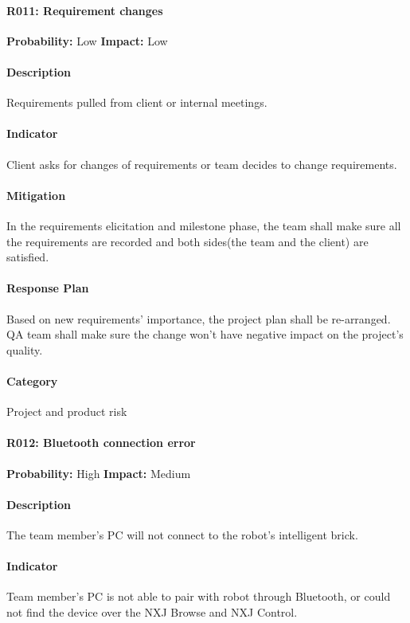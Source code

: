 \documentclass[11pt, a4paper]{report}
\begin{document}
	\paragraph{R011: Requirement changes} \hspace{1cm} \textbf{Probability: }Low\hspace{1cm}   \textbf{Impact: }Low
	\paragraph{Description}Requirements pulled from client or internal meetings.
	\paragraph{Indicator}Client asks for changes of requirements or team decides to change requirements.  
	\paragraph{Mitigation}In the requirements elicitation and milestone phase, the team shall make sure all the requirements are recorded and both sides(the team and the client) are satisfied.
	\paragraph{Response Plan}Based on new requirements' importance, the project plan shall be re-arranged. QA team shall make sure the change won't have negative impact on the project's quality. \\
	\paragraph{Category} Project and product risk

	\paragraph{R012: Bluetooth connection error} \hspace{1cm} \textbf{Probability: }High\hspace{1cm}   \textbf{Impact: }Medium
	\paragraph{Description}The team member's PC will not connect to the robot's intelligent brick.
	\paragraph{Indicator}Team member's PC is not able to pair with robot through Bluetooth, or could not find the device over the NXJ Browse and NXJ Control. 
\end{document}
